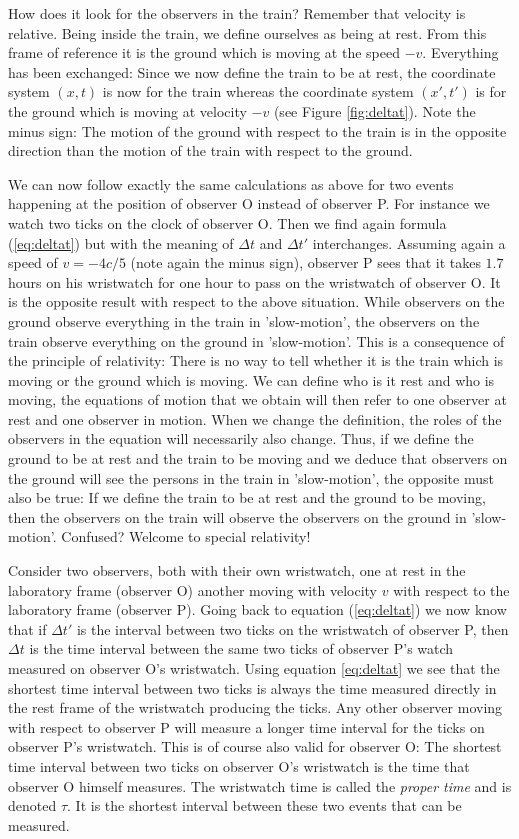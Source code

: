 {\begin{multicols}{2}
How does it look for the observers in the train? Remember that velocity is relative. Being inside the train, we define ourselves as being at rest. From this frame of reference it is the ground which is moving at the speed $-v$. Everything has been exchanged: Since we now define the train to be at rest, the coordinate system $(x,t)$ is now for the train whereas the coordinate system $(x',t')$ is for the ground which is moving at velocity $-v$ (see Figure \ref{fig:deltat}). Note the minus sign: The motion of the ground with respect to the train is in the opposite direction than the motion of the train with respect to the ground. 

We can now follow exactly the same calculations as above for two events happening at the position of observer O instead of observer P. For instance we watch two ticks on the clock of observer O. Then we find again formula (\ref{eq:deltat}) but with the meaning of $\Delta t$ and $\Delta t'$ interchanges. Assuming again a speed of $v=-4c/5$ (note again the minus sign), observer P sees that it takes $1.7$ hours on his wristwatch for one hour to pass on the wristwatch of observer O. It is the opposite result with respect to the above situation. While observers on the ground observe everything in the train in 'slow-motion', the observers on the train observe everything on the ground in 'slow-motion'. This is a consequence of the principle of relativity: There is no way to tell whether it is the train which is moving or the ground which is moving. We can define who is it rest and who is moving, the equations of motion that we obtain will then refer to one observer at rest and one observer in motion. When we change the definition, the roles of the observers in the equation will necessarily also change. Thus, if we define the ground to be at rest and the train to be moving and we deduce that observers on the ground will see the persons in the train in 'slow-motion', the opposite must also be true: If we define the train to be at rest and the ground to be moving, then the observers on the train will observe the observers on the ground in 'slow-motion'. Confused? Welcome to special relativity!

Consider two observers, both with their own wristwatch, one at rest in the laboratory frame (observer O) another moving with velocity $v$ with respect to the laboratory frame (observer P). Going back to equation (\ref{eq:deltat}) we now know that if $\Delta t'$ is the interval between two ticks on the wristwatch of observer P, then $\Delta t$ is the time interval between the same two ticks of observer P's watch measured on observer O's wristwatch. Using equation \ref{eq:deltat} we see that {the shortest time interval between two ticks is always the time measured directly in the rest frame of the wristwatch producing the ticks.} Any other observer moving with respect to observer P will measure a longer time interval for the ticks on observer P's wristwatch. This is of course also valid for observer O: The shortest time interval between two ticks on observer O's wristwatch is the time that observer O himself measures. The wristwatch time is called the {\it proper time} and is denoted $\tau$. It is the shortest interval between these two events that can be measured.


\end{multicols}}
